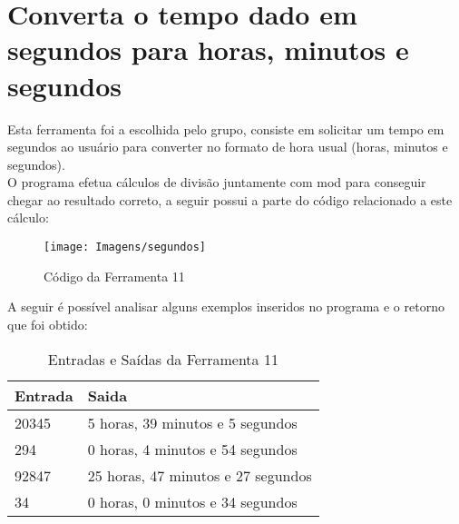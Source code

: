 \documentclass[12pt]{article}
\begin{document}
\newpage

\section{Converta o tempo dado em segundos para horas, minutos e segundos}
Esta ferramenta foi a escolhida pelo grupo, consiste em solicitar um tempo em segundos ao usuário para converter no formato de hora usual (horas, minutos e segundos).\\
O programa efetua cálculos de divisão juntamente com mod para conseguir chegar ao resultado correto, a seguir possui a parte do código relacionado a este cálculo:
\begin{figure}[!htb]
     \centering
     \texttt{[image: Imagens/segundos]}
     \caption{Código da Ferramenta 11}
     \label{Label de referência para a imagem}
\end{figure}

A seguir é possível analisar alguns exemplos inseridos no programa e o retorno que foi obtido:

\FloatBarrier
\begin{table}[ht]
\centering
\begin{tabular}{|l|l|}
\hline
\textbf{Entrada} & \textbf{Saida}\\
\hline
20345 &  5 horas, 39 minutos e 5 segundos\\
294 &  0 horas, 4 minutos e 54 segundos\\
92847 &  25 horas, 47 minutos e 27 segundos\\
34 &  0 horas, 0 minutos e 34 segundos\\

\hline
\end{tabular}
\caption{Entradas e Saídas da Ferramenta 11}
\end{table} 
\end{document}
